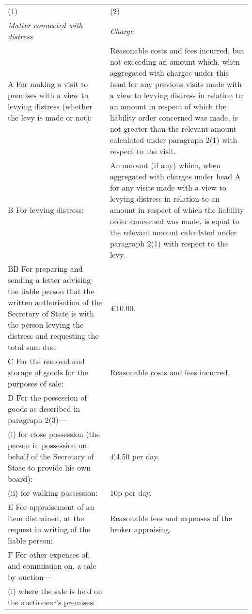\documentclass[12pt,a4paper]{article}
\begin{document}
{\noindent\footnotesize
\begin{longtable}{p{183pt}p{183pt}}
\hline
(1)&(2)\\
\itshape Matter connected with distress&\itshape Charge\\
\hline
\endhead
\hline
\endlastfoot
A {} For making a visit to premises with a view to levying distress (whether the levy is made or not):&
Reasonable costs and fees incurred, but not exceeding an amount which, when aggregated with charges under this head for any previous visits made with a view to levying distress in relation to an amount in respect of which the liability order concerned was made, is not greater than the relevant amount calculated under paragraph 2(1) with respect to the visit.\\
B {} For levying distress:&
An amount (if any) which, when aggregated with charges under head A for any visits made with a view to levying distress in relation to an amount in respect of which the liability order concerned was made, is equal to the relevant amount calculated under paragraph 2(1) with respect to the levy.\\
BB {} For preparing and sending a letter advising the liable person that the written authorisation of the Secretary of State is with the person levying the distress and requesting the total sum due: & £10.00.\\
C {} For the removal and storage of goods for the purposes of sale:&
Reasonable costs and fees incurred.\\
D {}  For the possession of goods as described in paragraph 2(3)—\\
\hspace{12pt}(i) for close possession (the person in possession on behalf of the Secretary of State to provide his own board):&
£4.50 per day.\\
\hspace{12pt}(ii) for walking possession:&
10p per day.\\ %
E {} For appraisement of an item distrained, at the request in writing of the liable person:&
Reasonable fees and expenses of the broker appraising.\\
F {} For other expenses of, and commission on, a sale by auction—\\
\hspace{12pt}(i) where the sale is held on the auctioneer’s premises:&

\end{longtable}}
\end{document}

